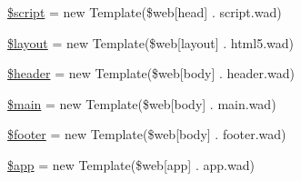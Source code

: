 \begin{DoxyCompactItemize}
\item 
\hyperlink{namespace_w_a_f_f_l_e_1_1_controller_af1de23de512bb5bf634c157dbb1b7758}{\$script} = new Template(\$web\mbox{[}\textquotesingle{}head\textquotesingle{}\mbox{]} . \textquotesingle{}script.\+wad\textquotesingle{})
\item 
\hyperlink{namespace_w_a_f_f_l_e_1_1_controller_a2b0d08e73a90b9443ce37506b7c6a544}{\$layout} = new Template(\$web\mbox{[}\textquotesingle{}layout\textquotesingle{}\mbox{]} . \textquotesingle{}html5.\+wad\textquotesingle{})
\item 
\hyperlink{namespace_w_a_f_f_l_e_1_1_controller_a4f44601f2b9dc8a1644bce53c94ce622}{\$header} = new Template(\$web\mbox{[}\textquotesingle{}body\textquotesingle{}\mbox{]} . \textquotesingle{}header.\+wad\textquotesingle{})
\item 
\hyperlink{namespace_w_a_f_f_l_e_1_1_controller_a67a14860123d3f27f92196239b0a5b46}{\$main} = new Template(\$web\mbox{[}\textquotesingle{}body\textquotesingle{}\mbox{]} . \textquotesingle{}main.\+wad\textquotesingle{})
\item 
\hyperlink{namespace_w_a_f_f_l_e_1_1_controller_abaa4216c852c51c380dd8f10d3cfe944}{\$footer} = new Template(\$web\mbox{[}\textquotesingle{}body\textquotesingle{}\mbox{]} . \textquotesingle{}footer.\+wad\textquotesingle{})
\item 
\hyperlink{namespace_w_a_f_f_l_e_1_1_controller_adfb117f244076aa9bc269269f7e57403}{\$app} = new Template(\$web\mbox{[}\textquotesingle{}app\textquotesingle{}\mbox{]} . \textquotesingle{}app.\+wad\textquotesingle{})
\end{DoxyCompactItemize}
